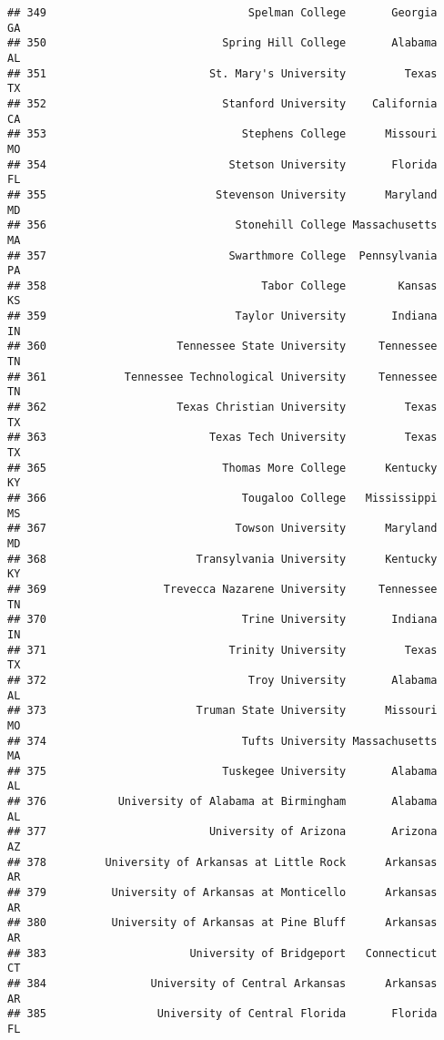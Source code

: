 \documentclass[
]{article}
\begin{document}
\begin{verbatim}
## 349                               Spelman College       Georgia         GA
## 350                           Spring Hill College       Alabama         AL
## 351                         St. Mary's University         Texas         TX
## 352                           Stanford University    California         CA
## 353                              Stephens College      Missouri         MO
## 354                            Stetson University       Florida         FL
## 355                          Stevenson University      Maryland         MD
## 356                             Stonehill College Massachusetts         MA
## 357                            Swarthmore College  Pennsylvania         PA
## 358                                 Tabor College        Kansas         KS
## 359                             Taylor University       Indiana         IN
## 360                    Tennessee State University     Tennessee         TN
## 361            Tennessee Technological University     Tennessee         TN
## 362                    Texas Christian University         Texas         TX
## 363                         Texas Tech University         Texas         TX
## 365                           Thomas More College      Kentucky         KY
## 366                              Tougaloo College   Mississippi         MS
## 367                             Towson University      Maryland         MD
## 368                       Transylvania University      Kentucky         KY
## 369                  Trevecca Nazarene University     Tennessee         TN
## 370                              Trine University       Indiana         IN
## 371                            Trinity University         Texas         TX
## 372                               Troy University       Alabama         AL
## 373                       Truman State University      Missouri         MO
## 374                              Tufts University Massachusetts         MA
## 375                           Tuskegee University       Alabama         AL
## 376           University of Alabama at Birmingham       Alabama         AL
## 377                         University of Arizona       Arizona         AZ
## 378         University of Arkansas at Little Rock      Arkansas         AR
## 379          University of Arkansas at Monticello      Arkansas         AR
## 380          University of Arkansas at Pine Bluff      Arkansas         AR
## 383                      University of Bridgeport   Connecticut         CT
## 384                University of Central Arkansas      Arkansas         AR
## 385                 University of Central Florida       Florida         FL

\end{verbatim}
\end{document}
